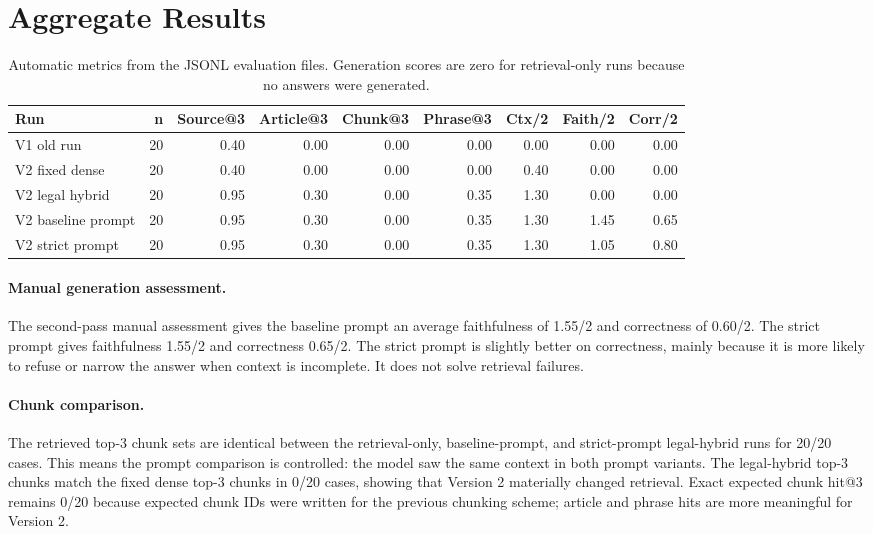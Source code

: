 \documentclass[11pt,a4paper]{article}
\begin{document}
\section{Aggregate Results}
\begin{table}[h]
\centering
\small
\begin{tabular}{lrrrrrrrr}
\toprule
Run & n & Source@3 & Article@3 & Chunk@3 & Phrase@3 & Ctx/2 & Faith/2 & Corr/2 \\
\midrule
V1 old run & 20 & 0.40 & 0.00 & 0.00 & 0.00 & 0.00 & 0.00 & 0.00 \\
V2 fixed dense & 20 & 0.40 & 0.00 & 0.00 & 0.00 & 0.40 & 0.00 & 0.00 \\
V2 legal hybrid & 20 & 0.95 & 0.30 & 0.00 & 0.35 & 1.30 & 0.00 & 0.00 \\
V2 baseline prompt & 20 & 0.95 & 0.30 & 0.00 & 0.35 & 1.30 & 1.45 & 0.65 \\
V2 strict prompt & 20 & 0.95 & 0.30 & 0.00 & 0.35 & 1.30 & 1.05 & 0.80 \\
\bottomrule
\end{tabular}
\caption{Automatic metrics from the JSONL evaluation files. Generation scores are zero for retrieval-only runs because no answers were generated.}
\end{table}
\paragraph{Manual generation assessment.}
The second-pass manual assessment gives the baseline prompt an average faithfulness of 1.55/2 and correctness of 0.60/2. The strict prompt gives faithfulness 1.55/2 and correctness 0.65/2. The strict prompt is slightly better on correctness, mainly because it is more likely to refuse or narrow the answer when context is incomplete. It does not solve retrieval failures.
\paragraph{Chunk comparison.}
The retrieved top-3 chunk sets are identical between the retrieval-only, baseline-prompt, and strict-prompt legal-hybrid runs for 20/20 cases. This means the prompt comparison is controlled: the model saw the same context in both prompt variants. The legal-hybrid top-3 chunks match the fixed dense top-3 chunks in 0/20 cases, showing that Version 2 materially changed retrieval. Exact expected chunk hit@3 remains 0/20 because expected chunk IDs were written for the previous chunking scheme; article and phrase hits are more meaningful for Version 2.
\end{document}
